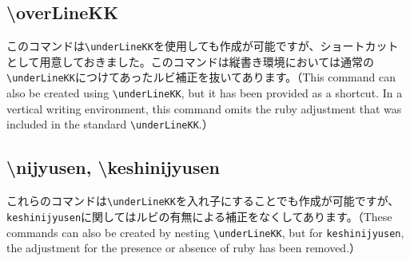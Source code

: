 \documentclass[luatex,fontsize=8pt,paper=b5,twoside]{jlreq}%
\begin{document}
\subsection{\textbackslash overLineKK}
このコマンドは\verb|\underLineKK|を使用しても作成が可能ですが、ショートカットとして用意しておきました。このコマンドは縦書き環境においては通常の\verb|\underLineKK|につけてあったルビ補正を抜いてあります。（This command can also be created using \verb|\underLineKK|, but it has been provided as a shortcut. In a vertical writing environment, this command omits the ruby adjustment that was included in the standard \verb|\underLineKK|.）



\subsection{\textbackslash nijyusen, \textbackslash keshinijyusen}
これらのコマンドは\verb|\underLineKK|を入れ子にすることでも作成が可能ですが、\verb|keshinijyusen|に関してはルビの有無による補正をなくしてあります。（These commands can also be created by nesting \verb|\underLineKK|, but for \verb|keshinijyusen|, the adjustment for the presence or absence of ruby has been removed.）

\end{document}
